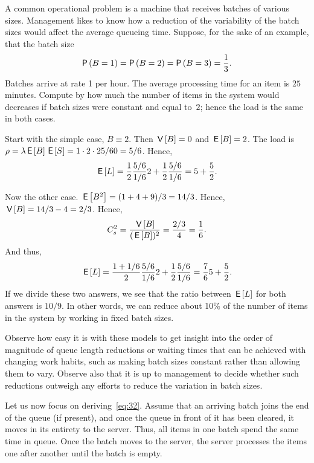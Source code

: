 \begin{exercise}
 A common operational problem is a machine that receives batches of
 various sizes. Management likes to know how a reduction of the
 variability of the batch sizes would affect the average queueing time.
 Suppose, for the sake of an example, that the batch size 
 \begin{equation*}
 \P{B=1} = \P{B=2} = \P{B=3} = \frac 13.
 \end{equation*}
 Batches arrive at rate 1 per hour.
 The average processing time for an item is $25$ minutes.
 Compute by how much the number of items in the system would decreases if batch sizes were constant and equal to~$2$; hence the load is the same in both cases.
\begin{solution}
 Start with the simple case, $B\equiv 2$. Then $\,\mathsf{V}\left[B\right]=0$ and
 $\,\mathsf{E}\left[B\right] = 2$. The load is $\rho=\lambda \,\mathsf{E}\left[B\right] \,\mathsf{E}\left[S\right] = 1\cdot 2 \cdot 25/60 = 5/6$. Hence,
 \begin{equation*}
 \,\mathsf{E}\left[L\right] = \frac 12 \frac{5/6}{1/6} 2 + \frac 12 \frac{5/6}{1/6} = 5 + \frac52.
 \end{equation*}

Now the other case. $\,\mathsf{E}\left[B^2\right] = (1+4+9)/3 = 14/3$. Hence, $\,\mathsf{V}\left[B\right]=14/3 - 4=2/3$. Hence, 
\begin{equation*}
C_s^2=\frac{\,\mathsf{V}\left[B\right]}{(\,\mathsf{E}\left[B\right])^2} = \frac{2/3}4 = \frac 16.
\end{equation*}
And thus, 
 \begin{equation*}
 \,\mathsf{E}\left[L\right] = \frac {1+1/6}2 \frac{5/6}{1/6} 2 + \frac 12 \frac{5/6}{1/6} = \frac76 5 + \frac 52.
 \end{equation*}
 If we divide these two answers, we see that the ratio between
 $\,\mathsf{E}\left[L\right]$ for both answers is $10/9$. In other words, we can
 reduce about 10\% of the number of items in the system by working
 in fixed batch sizes. 

Observe how easy it is with these models to get insight into the order of magnitude of queue length reductions or waiting times that can be achieved with changing work habits, such as making batch sizes constant rather than allowing them to vary.
Observe also that it is up to management to decide whether such reductions outweigh any efforts to reduce the variation in batch sizes.

\end{solution}

\end{exercise}


Let us now focus on deriving~\cref{eq:32}.
Assume that an arriving batch joins the end of the queue (if present), and once the queue in front of it has been cleared, it moves in its entirety to the server.
Thus, all items in one batch spend the same time in queue.
Once the batch moves to the server, the server processes the items one after another until the batch is empty.

